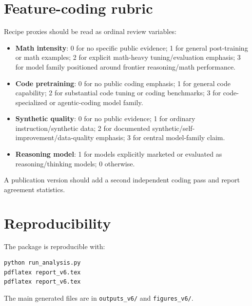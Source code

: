 \documentclass[11pt]{article}
\begin{document}
\section{Feature-coding rubric}
Recipe proxies should be read as ordinal review variables:
\begin{itemize}[leftmargin=*]
\item \textbf{Math intensity}: 0 for no specific public evidence; 1 for general post-training or math examples; 2 for explicit math-heavy tuning/evaluation emphasis; 3 for model family positioned around frontier reasoning/math performance.
\item \textbf{Code pretraining}: 0 for no public coding emphasis; 1 for general code capability; 2 for substantial code tuning or coding benchmarks; 3 for code-specialized or agentic-coding model family.
\item \textbf{Synthetic quality}: 0 for no public evidence; 1 for ordinary instruction/synthetic data; 2 for documented synthetic/self-improvement/data-quality emphasis; 3 for central model-family claim.
\item \textbf{Reasoning model}: 1 for models explicitly marketed or evaluated as reasoning/thinking models; 0 otherwise.
\end{itemize}
A publication version should add a second independent coding pass and report agreement statistics.

\section{Reproducibility}
The package is reproducible with:
\begin{verbatim}
python run_analysis.py
pdflatex report_v6.tex
pdflatex report_v6.tex
\end{verbatim}
The main generated files are in \texttt{outputs\_v6/} and \texttt{figures\_v6/}.
\end{document}
